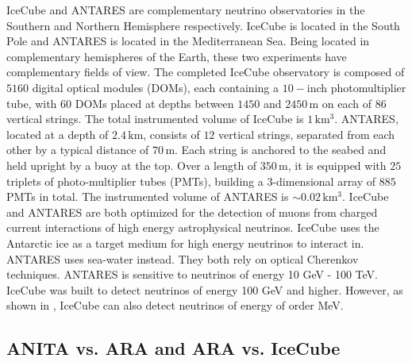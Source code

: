 \documentclass[12pt]{article}
\begin{document}
\begin{doublespace}
IceCube and ANTARES are complementary neutrino observatories in the Southern and Northern Hemisphere respectively. IceCube is located in the South Pole and ANTARES is located in the Mediterranean Sea. Being located in complementary hemispheres of the Earth, these two experiments have complementary fields of view. The completed IceCube observatory is composed of $5160$ digital optical modules (DOMs), each containing a $10-$inch photomultiplier tube, with $60$ DOMs placed at depths between $1450$ and $2450 \, \mathrm{m}$ on each of $86$ vertical strings. The total instrumented volume of IceCube is $1 \, \mathrm{km^3}$. ANTARES, located at a depth of $2.4 \, \mathrm{km}$, consists of $12$ vertical strings, separated from each other by a typical distance of $70 \, \mathrm{m}$. Each string is anchored to the seabed and held upright by a buoy at the top. Over a length of $350 \, \mathrm{m}$, it is equipped with $25$ triplets of photo-multiplier tubes (PMTs), building a 3-dimensional array of $885$ PMTs in total. The instrumented volume of ANTARES is $\sim  0.02 \, \mathrm{km^3}$. IceCube and ANTARES are both optimized for the detection of muons from charged current interactions of high energy astrophysical neutrinos. IceCube uses the Antarctic ice as a target medium for high energy neutrinos to interact in. ANTARES uses sea-water instead. They both rely on optical Cherenkov techniques. ANTARES is sensitive to neutrinos of energy 10 GeV - 100 TeV. IceCube was built to detect neutrinos of energy 100 GeV and higher. However, as shown in \cite{IClow}, IceCube can also detect neutrinos of energy of order MeV. 

\subsection{ANITA vs. ARA and ARA vs. IceCube} 


\end{doublespace}
\end{document}
